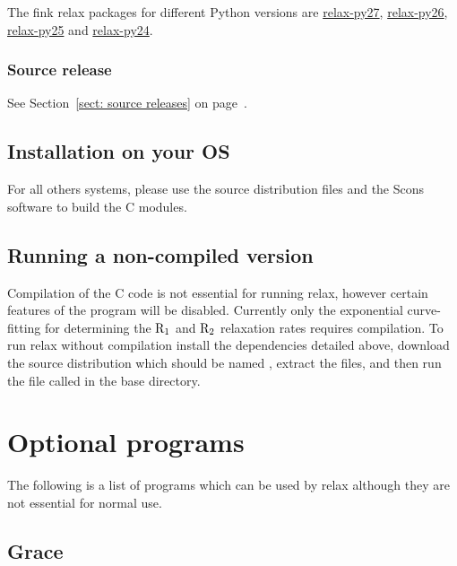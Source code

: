 The fink relax packages for different Python versions are \href{http://pdb.finkproject.org/pdb/package.php/relax-py27}{relax-py27}, \href{http://pdb.finkproject.org/pdb/package.php/relax-py26}{relax-py26}, \href{http://pdb.finkproject.org/pdb/package.php/relax-py25}{relax-py25} and \href{http://pdb.finkproject.org/pdb/package.php/relax-py24}{relax-py24}.

\subsubsection{Source release}

See Section~\ref{sect: source releases} on page~\pageref{sect: source releases}.


\subsection{Installation on your OS}

For all others systems, please use the source distribution files and the Scons software to build the C modules.



\subsection{Running a non-compiled version}

Compilation of the C code is not essential for running relax, however certain features of the program will be disabled.  Currently only the exponential curve-fitting for determining the $\mathrm{R}_1$ and $\mathrm{R}_2$ relaxation rates requires compilation.  To run relax without compilation install the dependencies detailed above, download the source distribution which should be named , extract the files, and then run the file called  in the base directory.




\section{Optional programs}

The following is a list of programs which can be used by relax although they are not essential for normal use.


\subsection{Grace}

